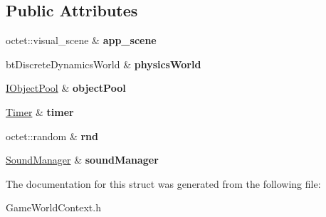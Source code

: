 \subsection*{Public Attributes}
\begin{DoxyCompactItemize}
\item 
\hypertarget{struct_arena_1_1_game_world_context_a8435384043a8650d471e6d81774cd6b1}{octet\+::visual\+\_\+scene \& {\bfseries app\+\_\+scene}}\label{struct_arena_1_1_game_world_context_a8435384043a8650d471e6d81774cd6b1}

\item 
\hypertarget{struct_arena_1_1_game_world_context_ac78e8b5a57c4b835acf9c0cbc0c7c6b9}{bt\+Discrete\+Dynamics\+World \& {\bfseries physics\+World}}\label{struct_arena_1_1_game_world_context_ac78e8b5a57c4b835acf9c0cbc0c7c6b9}

\item 
\hypertarget{struct_arena_1_1_game_world_context_a0d6ae8fc0f185d15ca8983539257fc4c}{\hyperlink{class_arena_1_1_i_object_pool}{I\+Object\+Pool} \& {\bfseries object\+Pool}}\label{struct_arena_1_1_game_world_context_a0d6ae8fc0f185d15ca8983539257fc4c}

\item 
\hypertarget{struct_arena_1_1_game_world_context_aca9e37bd70b6a42b5719603c7fda115d}{\hyperlink{class_timer}{Timer} \& {\bfseries timer}}\label{struct_arena_1_1_game_world_context_aca9e37bd70b6a42b5719603c7fda115d}

\item 
\hypertarget{struct_arena_1_1_game_world_context_a8e03ee8034f4e2de2b7dfcc89d15dd33}{octet\+::random \& {\bfseries rnd}}\label{struct_arena_1_1_game_world_context_a8e03ee8034f4e2de2b7dfcc89d15dd33}

\item 
\hypertarget{struct_arena_1_1_game_world_context_a9a00b23202f6081801db7391a184371e}{\hyperlink{class_arena_1_1_sound_manager}{Sound\+Manager} \& {\bfseries sound\+Manager}}\label{struct_arena_1_1_game_world_context_a9a00b23202f6081801db7391a184371e}

\end{DoxyCompactItemize}


The documentation for this struct was generated from the following file\+:\begin{DoxyCompactItemize}
\item 
Game\+World\+Context.\+h\end{DoxyCompactItemize}
